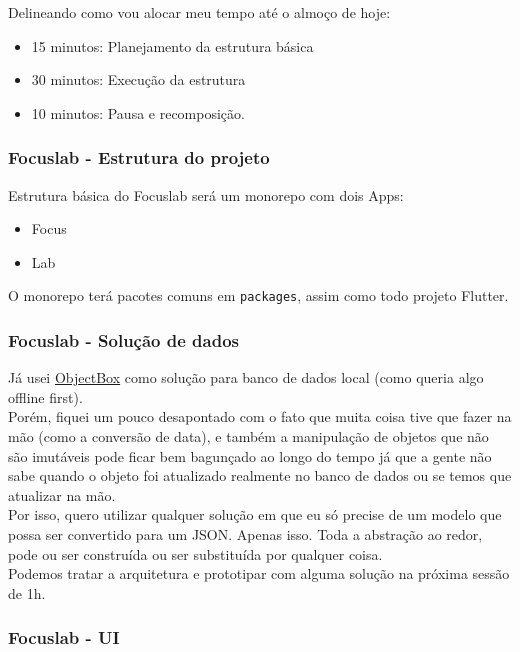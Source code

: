 \documentclass[11pt]{article}
\begin{document}
Delineando como vou alocar meu tempo até o almoço de hoje:

\begin{itemize}
    \item 15 minutos: Planejamento da estrutura básica
    \item 30 minutos: Execução da estrutura
    \item 10 minutos: Pausa e recomposição.
\end{itemize}

\subsubsection{Focuslab - Estrutura do projeto}

Estrutura básica do Focuslab será um monorepo com dois Apps: 

\begin{itemize}
    \item Focus
    \item Lab
\end{itemize}

O monorepo terá pacotes comuns em {\tt packages}, assim como todo projeto Flutter.\\

\subsubsection{Focuslab - Solução de dados}

Já usei \href{https://pub.dev/packages/objectbox}{ObjectBox} como solução para banco de dados local (como queria algo offline first). \\

Porém, fiquei um pouco desapontado com o fato que muita coisa tive que fazer na mão (como a conversão de data), e também a manipulação de objetos que não são imutáveis pode ficar bem bagunçado ao longo do tempo já que a gente não sabe quando o objeto foi atualizado realmente no banco de dados ou se temos que atualizar na mão.\\

Por isso, quero utilizar qualquer solução em que eu só precise de um modelo que possa ser convertido para um JSON. Apenas isso. Toda a abstração ao redor, pode ou ser construída ou ser substituída por qualquer coisa.\\

Podemos tratar a arquitetura e prototipar com alguma solução na próxima sessão de 1h.

\subsubsection{Focuslab - UI}
\end{document}
